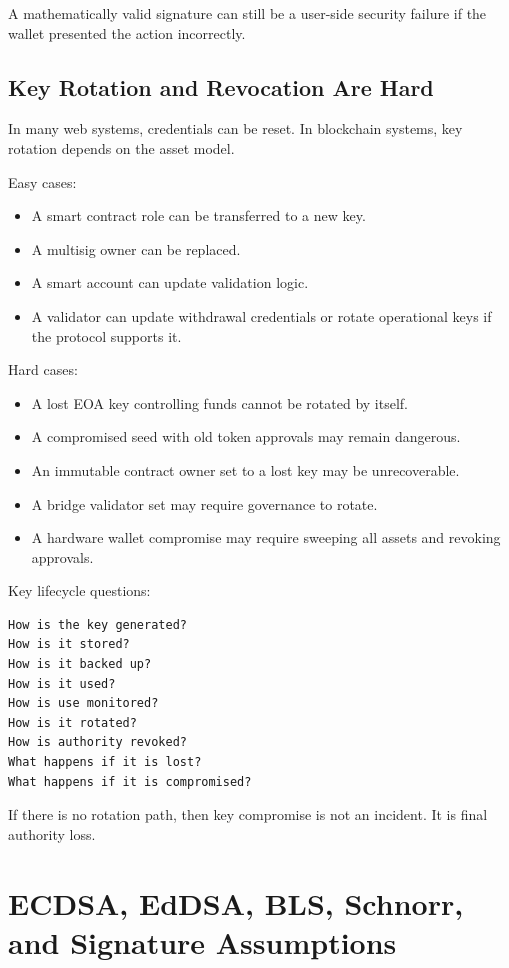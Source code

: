 A mathematically valid signature can still be a user-side security
failure if the wallet presented the action incorrectly.

\subsection{Key Rotation and Revocation Are Hard}

In many web systems, credentials can be reset. In blockchain systems,
key rotation depends on the asset model.

Easy cases:

\begin{itemize}
\tightlist
\item
  A smart contract role can be transferred to a new key.
\item
  A multisig owner can be replaced.
\item
  A smart account can update validation logic.
\item
  A validator can update withdrawal credentials or rotate operational
  keys if the protocol supports it.
\end{itemize}

Hard cases:

\begin{itemize}
\tightlist
\item
  A lost EOA key controlling funds cannot be rotated by itself.
\item
  A compromised seed with old token approvals may remain dangerous.
\item
  An immutable contract owner set to a lost key may be unrecoverable.
\item
  A bridge validator set may require governance to rotate.
\item
  A hardware wallet compromise may require sweeping all assets and
  revoking approvals.
\end{itemize}

Key lifecycle questions:

\begin{lstlisting}
How is the key generated?
How is it stored?
How is it backed up?
How is it used?
How is use monitored?
How is it rotated?
How is authority revoked?
What happens if it is lost?
What happens if it is compromised?
\end{lstlisting}

If there is no rotation path, then key compromise is not an incident. It
is final authority loss.

\section{ECDSA, EdDSA, BLS, Schnorr, and Signature Assumptions}

